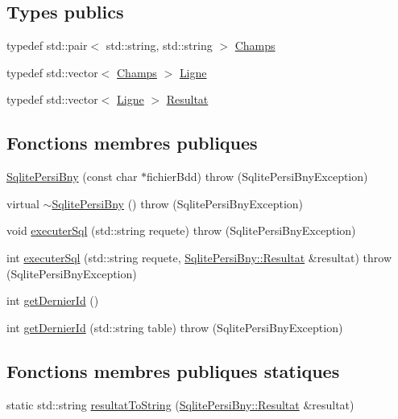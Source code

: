 \subsection*{Types publics}
\begin{DoxyCompactItemize}
\item 
typedef std\+::pair$<$ std\+::string, std\+::string $>$ \hyperlink{classSqlitePersiBny_af3de7ea7bd4146b4ce0a00ceae01befd}{Champs}
\item 
typedef std\+::vector$<$ \hyperlink{classSqlitePersiBny_af3de7ea7bd4146b4ce0a00ceae01befd}{Champs} $>$ \hyperlink{classSqlitePersiBny_a32400b54d9a08cae7d60d985a5d48892}{Ligne}
\item 
typedef std\+::vector$<$ \hyperlink{classSqlitePersiBny_a32400b54d9a08cae7d60d985a5d48892}{Ligne} $>$ \hyperlink{classSqlitePersiBny_a04bdd1bacd9241210ea44ec2c072f79b}{Resultat}
\end{DoxyCompactItemize}
\subsection*{Fonctions membres publiques}
\begin{DoxyCompactItemize}
\item 
\hyperlink{classSqlitePersiBny_af4ff22e110cfc9ad07460e2aedb9d884}{Sqlite\+Persi\+Bny} (const char $\ast$fichier\+Bdd)  throw (\+Sqlite\+Persi\+Bny\+Exception)
\item 
virtual \hyperlink{classSqlitePersiBny_a20a424146469e8d6ca9347c660d1027c}{$\sim$\+Sqlite\+Persi\+Bny} ()  throw (\+Sqlite\+Persi\+Bny\+Exception)
\item 
void \hyperlink{classSqlitePersiBny_aa018371d06ba831126a6c4fdc77b741f}{executer\+Sql} (std\+::string requete)  throw (\+Sqlite\+Persi\+Bny\+Exception)
\item 
int \hyperlink{classSqlitePersiBny_aaca09292fb3eb5e7bbf176c86964ff73}{executer\+Sql} (std\+::string requete, \hyperlink{classSqlitePersiBny_a04bdd1bacd9241210ea44ec2c072f79b}{Sqlite\+Persi\+Bny\+::\+Resultat} \&resultat)  throw (\+Sqlite\+Persi\+Bny\+Exception)
\item 
int \hyperlink{classSqlitePersiBny_a44284ce3b32df4a0f2c0f053323cc4b9}{get\+Dernier\+Id} ()
\item 
int \hyperlink{classSqlitePersiBny_a3f6a2b7a50d826cc030ac60aadf54d8f}{get\+Dernier\+Id} (std\+::string table)  throw (\+Sqlite\+Persi\+Bny\+Exception)
\end{DoxyCompactItemize}
\subsection*{Fonctions membres publiques statiques}
\begin{DoxyCompactItemize}
\item 
static std\+::string \hyperlink{classSqlitePersiBny_a6c80449c682a18e9e9ce0a860f05088d}{resultat\+To\+String} (\hyperlink{classSqlitePersiBny_a04bdd1bacd9241210ea44ec2c072f79b}{Sqlite\+Persi\+Bny\+::\+Resultat} \&resultat)
\end{DoxyCompactItemize}


